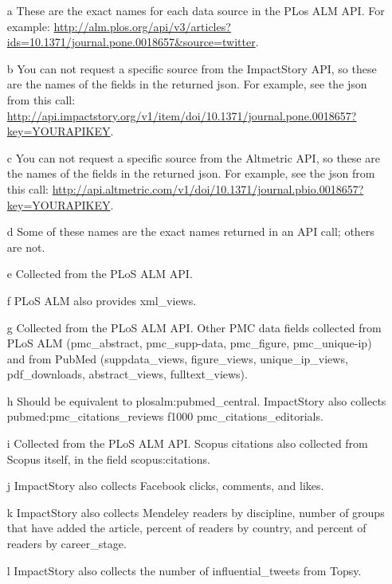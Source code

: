 \documentclass[letterpaper,superscriptaddress,showkeys,longbibliography]{revtex4-1}\usepackage{graphicx, color}
\begin{document}
\begin{itemize}
    \item[a] These are the exact names for each data source in the PLos ALM API. For example: \url{http://alm.plos.org/api/v3/articles?ids=10.1371/journal.pone.0018657&source=twitter}.
    \item[b] You can not request a specific source from the ImpactStory API, so these are the names of the fields in the returned json. For example, see the json from this call: \url{http://api.impactstory.org/v1/item/doi/10.1371/journal.pone.0018657?key=YOURAPIKEY}.
    \item[c] You can not request a specific source from the Altmetric API, so these are the names of the fields in the returned json. For example, see the json from this call: \url{http://api.altmetric.com/v1/doi/10.1371/journal.pbio.0018657?key=YOURAPIKEY}.
    \item[d] Some of these names are the exact names returned in an API call; others are not.
    \item[e] Collected from the PLoS ALM API. 
    \item[f] PLoS ALM also provides xml\_views. 
    \item[g] Collected from the PLoS ALM API. Other PMC data fields collected from PLoS ALM (pmc\_abstract, pmc\_supp-data, pmc\_figure, pmc\_unique-ip) and from PubMed (suppdata\_views, figure\_views, unique\_ip\_views, pdf\_downloads, abstract\_views, fulltext\_views).
    \item[h] Should be equivalent to plosalm:pubmed\_central. ImpactStory also collects pubmed:pmc\_citations\_reviews f1000 pmc\_citations\_editorials.
    \item[i] Collected from the PLoS ALM API. Scopus citations also collected from Scopus itself, in the field scopus:citations.
    \item[j] ImpactStory also collects Facebook clicks, comments, and likes. 
    \item[k] ImpactStory also collects Mendeley readers by discipline, number of groups that have added the article, percent of readers by country, and percent of readers by career\_stage. 
    \item[l] ImpactStory also collects the number of influential\_tweets from Topsy.
\end{itemize}
\end{document}
